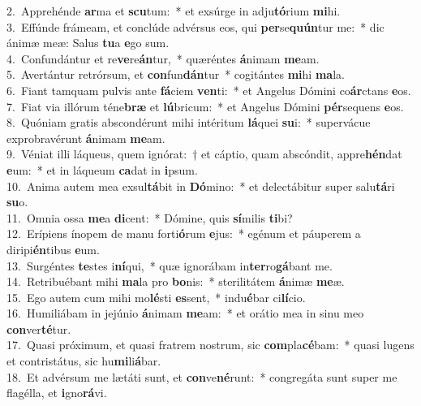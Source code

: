 {2.~}Apprehénde \textbf{ar}ma et \textbf{scu}tum:~* et exsúrge in adju\textbf{tó}rium \textbf{mi}hi.\\
{3.~}Effúnde frámeam, et conclúde advérsus eos, qui \textbf{per}se\textbf{quún}tur me:~* dic ánimæ meæ: Salus \textbf{tu}a \textbf{e}go sum.\\
{4.~}Confundántur et re\textbf{ve}re\textbf{án}tur,~* quæréntes \textbf{á}nimam \textbf{me}am.\\
{5.~}Avertántur retrórsum, et \textbf{con}fun\textbf{dán}tur~* cogitántes \textbf{mi}hi \textbf{ma}la.\\
{6.~}Fiant tamquam pulvis ante \textbf{fá}ciem \textbf{ven}ti:~* et Angelus Dómini co\textbf{ár}ctans \textbf{e}os.\\
{7.~}Fiat via illórum téne\textbf{bræ} et \textbf{lú}bricum:~* et Angelus Dómini \textbf{pér}sequens \textbf{e}os.\\
{8.~}Quóniam gratis abscondérunt mihi intéritum \textbf{lá}quei \textbf{su}i:~* supervácue exprobravérunt \textbf{á}nimam \textbf{me}am.\\
{9.~}Véniat illi láqueus, quem ignórat:~† et cáptio, quam abscóndit, appre\textbf{hén}dat \textbf{e}um:~* et in láqueum \textbf{ca}dat in \textbf{i}psum.\\
{10.~}Anima autem mea exsul\textbf{tá}bit in \textbf{Dó}mino:~* et delectábitur super salu\textbf{tá}ri \textbf{su}o.\\
{11.~}Omnia ossa \textbf{me}a \textbf{di}cent:~* Dómine, quis \textbf{sí}milis \textbf{ti}bi?\\
{12.~}Erípiens ínopem de manu forti\textbf{ó}rum \textbf{e}jus:~* egénum et páuperem a diripi\textbf{én}tibus \textbf{e}um.\\
{13.~}Surgéntes \textbf{te}stes i\textbf{ní}qui,~* quæ ignorábam in\textbf{ter}ro\textbf{gá}bant me.\\
{14.~}Retribuébant mihi \textbf{ma}la pro \textbf{bo}nis:~* sterilitátem \textbf{á}nimæ \textbf{me}æ.\\
{15.~}Ego autem cum mihi mo\textbf{lé}sti \textbf{es}sent,~* indu\textbf{é}bar ci\textbf{lí}cio.\\
{16.~}Humiliábam in jejúnio \textbf{á}nimam \textbf{me}am:~* et orátio mea in sinu meo \textbf{con}ver\textbf{té}tur.\\
{17.~}Quasi próximum, et quasi fratrem nostrum, sic \textbf{com}pla\textbf{cé}bam:~* quasi lugens et contristátus, sic hu\textbf{mi}li\textbf{á}bar.\\
{18.~}Et advérsum me lætáti sunt, et \textbf{con}ve\textbf{né}runt:~* congregáta sunt super me flagélla, et \textbf{i}gno\textbf{rá}vi.\\
